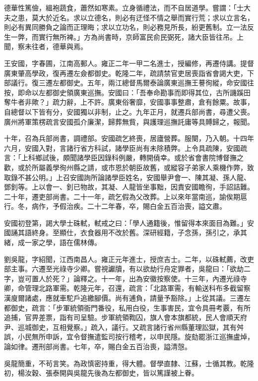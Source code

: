 \begin{pinyinscope}
德華性篤儉，縕袍蔬食，蕭然如寒素。立身循禮法，而不自居道學。嘗謂：「士大夫之患，莫大於近名。求以立德名，則必有迂怪不情之舉而實行荒；求以立言名，則必有異同勝負之論而正理晦；求以立功名，則必務見所長，紛更舊制。立一法反生一弊，而實行無所裨。」方為尚書時，京師富民俞民弼死，諸大臣皆往吊。上聞，察未往者，德華與焉。

王安國，字春圃，江南高郵人。雍正二年一甲二名進士，授編修，再遷侍講。提督廣東肇高學政，復再遷左僉都御史。乾隆二年，疏請禁官吏居喪詣省會謁大吏，下部議行。復三遷左都御史。五年，兩江總督馬爾泰論廣東巡撫王謩徇縱，命安國往按，即命以左都御史領廣東巡撫。安國曰：「吾奉命勘事而即得其位，古所譏蹊田奪牛者非歟？」疏力辭，上不許。廣東俗奢靡，安國事事整肅，倉有餘粟。故事，自總督以下皆有分，安國獨以非制，止之。九年正月，就遷兵部尚書，尋遭父喪。廣州將軍策楞疏言安國孤介廉潔，歸葬無貲，與護理巡撫託庸等具賻歸之，報聞。

十年，召為兵部尚書，調禮部。安國疏乞終喪，居廬營葬。服闋，乃入朝。十四年六月，安國入對，言諸行省方科試，諸學臣尚有未除積弊。上令具疏陳，安國疏言：「上科鄉試後，頗聞諸學臣因錄科例嚴，轉開僥幸。或於省會書院博督撫之歡，或於所屬義學徇州縣之請，或市恩於朝臣故舊，或縱容子弟家人乘機作弊，致取錄不甚公明。」上召安國詢所論諸學臣姓名，安國舉尹會一、陳其凝、孫人龍、鄧釗等。上以會一、釗已物故，其凝、人龍皆坐事黜，因責安國瞻徇，手詔詰難。二十年，遷吏部尚書。二十一年，疏乞假為父改葬。上以來年當南巡，諭俟期扈行。冬，病作，予假治疾。二十二年春，卒，賜白金五百治喪，謚文肅。

安國初登第，謁大學士硃軾，軾戒之曰：「學人通籍後，惟留得本來面目為難。」安國誦其語終身。至顯仕，衣食器用不改於舊。深研經籍，子念孫，孫引之，承其緒，成一家之學，語在儒林傳。

劉吳龍，字紹聞，江西南昌人。雍正元年進士，授庶吉士。二年，以硃軾薦，改吏部主事。六遷至光祿寺少卿。嘗視讞牘，有以欲劫行舟定罪者，吳龍曰：「欲劫二字，豈可置人於死？」論釋之。十一年，出為安徽按察使。十三年，內遷光祿寺卿，命管理北路軍需。乾隆元年，召還，疏言：「北路軍需，有輸送科布多截留察漢廋爾諸處，應就車駝戶追繳腳價。尚有逋負，請量予豁除。」上從其議。三遷左都御史，疏言：「步軍統領衙門番役，私用白役，生事害民，宜令具冊考覈，有所追捕，官畀差票，詣有司呈驗。步軍統領鞫囚，旗人會本旗都統，民人會順天府尹、巡城御史，互相覺察。」疏入，議行。又疏言諸行省州縣董理訟獄，其有舛誤，小民無所申訴，宜令督撫遣監司按行稽考，以申民隱。旋劾罷浙江巡撫盧焯，論如律。遷刑部尚書。七年，卒，賜白金五百治喪，謚清愨。

吳龍簡重，不茍言笑。為政慎密持重，得大體。督學直隸、江蘇，士循其教。乾隆初，楊汝穀、張泰開與吳龍先後為左都御史，皆以篤謹被上眷。


\end{pinyinscope}
